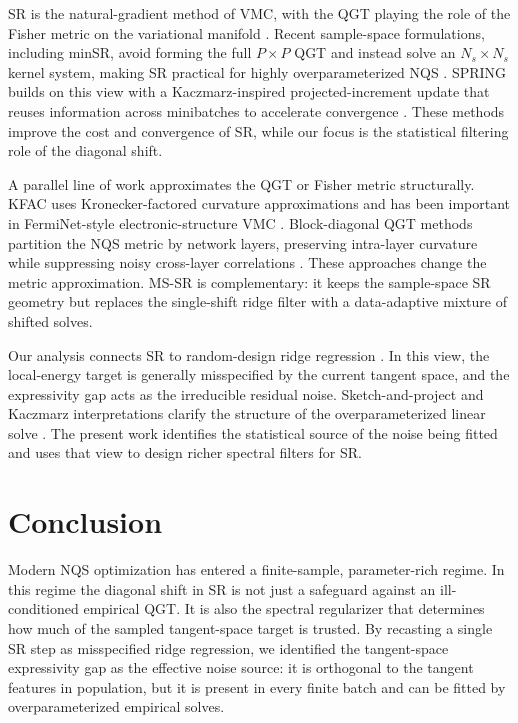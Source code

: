 \documentclass{article}
\begin{document}
SR is the natural-gradient method of VMC, with the QGT playing the role of the
Fisher metric on the variational manifold
\citep{sorella1998green, sorella2001generalized, carleo2017solving}. Recent sample-space formulations, including minSR, avoid forming the full
\(P\times P\) QGT and instead solve an \(N_s\times N_s\) kernel system, making
SR practical for highly overparameterized NQS
\citep{chen2024empowering, rende2024simple}. SPRING builds on this view with a
Kaczmarz-inspired projected-increment update that reuses information across
minibatches to accelerate convergence \citep{goldshlager2024spring,goldshlager2025sketch}. These
methods improve the cost and convergence of SR, while our focus is the
statistical filtering role of the diagonal shift.

A parallel line of work approximates the QGT or Fisher metric structurally.
KFAC uses Kronecker-factored curvature approximations and has been important in
FermiNet-style electronic-structure VMC
\citep{martens2015optimizing, pfau2020ferminet}. Block-diagonal
QGT methods partition the NQS metric by network layers, preserving intra-layer
curvature while suppressing noisy cross-layer correlations
\citep{shokry2025blockqgt}. These approaches change the metric approximation.
MS-SR is complementary: it keeps the sample-space SR geometry but replaces
the single-shift ridge filter with a data-adaptive mixture of shifted solves.

Our analysis connects SR to random-design ridge regression
\citep{hsu2012random}. In this view, the local-energy target is generally
misspecified by the current tangent space, and the expressivity gap
acts as the irreducible residual noise. Sketch-and-project and Kaczmarz
interpretations clarify the structure of the overparameterized linear solve
\citep{strohmer2009randomized, goldshlager2024spring, goldshlager2025sketch}. The
present work identifies the statistical source of the noise being fitted and
uses that view to design richer spectral filters for SR.

\section{Conclusion}

Modern NQS optimization has entered a finite-sample, parameter-rich regime. In
this regime the diagonal shift in SR is not just a safeguard against an
ill-conditioned empirical QGT. It is also the spectral regularizer that
determines how much of the sampled tangent-space target is trusted. By recasting
a single SR step as misspecified ridge regression, we identified the
tangent-space expressivity gap as the effective noise source: it is orthogonal
to the tangent features in population, but it is present in every finite batch
and can be fitted by overparameterized empirical solves.
\end{document}
